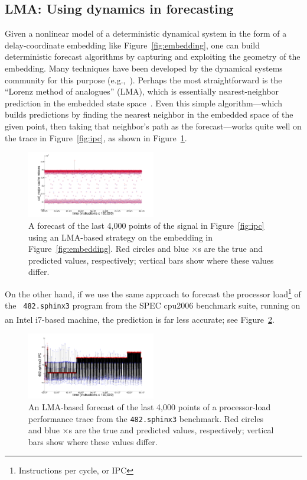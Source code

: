 \documentclass{article}
\begin{document}
 \subsection{LMA: Using dynamics in forecasting}

Given a nonlinear model of a deterministic dynamical system in the
form of a delay-coordinate embedding like Figure~\ref{fig:embedding},
one can build deterministic forecast algorithms by capturing and
exploiting the geometry of the embedding.  Many techniques have been
developed by the dynamical systems community for this purpose
(e.g.,~\cite{casdagli-eubank92,weigend-book}).  Perhaps the most straightforward
is the ``Lorenz method of analogues'' (LMA), which is essentially
nearest-neighbor prediction in the embedded state
space~\cite{lorenz-analogues}.  Even this simple algorithm---which
builds predictions by finding the nearest neighbor in the embedded
space of the given point, then taking that neighbor's path as the
forecast---works quite well on the trace in Figure~\ref{fig:ipc}, as
shown in Figure~\ref{fig:cachePredTS}.
%
\begin{figure}[htbp]
  \centering
    \includegraphics[width=0.5\textwidth]{figs/colCachePredTS}
    \caption{A forecast of the last 4,000 points of the signal in
      Figure~\ref{fig:ipc} using an LMA-based strategy on the
      embedding in Figure~\ref{fig:embedding}.  Red circles and blue
      $\times$s are the true and predicted values, respectively;
      vertical bars show where these values differ. }
\label{fig:cachePredTS}
\end{figure}
%
On the other hand, if we use the same approach to forecast the
processor load\footnote{Instructions per cycle, or IPC} of the {\tt
  482.sphinx3} program from the SPEC cpu2006 benchmark suite, running
on an Intel i7\textsuperscript{\textregistered}-based machine, the
prediction is far less accurate; see Figure~\ref{fig:predsphinx}.
%
\begin{figure}[htbp]
  \centering
    \includegraphics[width=0.5\textwidth]{figs/sphinxPredicTS}
     \caption{An LMA-based forecast of the last 4,000 points of a
       processor-load performance trace from the {\tt 482.sphinx3}
       benchmark.  Red circles and blue $\times$s are the true and
       predicted values, respectively; vertical bars show where these
       values differ.}
\label{fig:predsphinx}
\end{figure}
\end{document}
